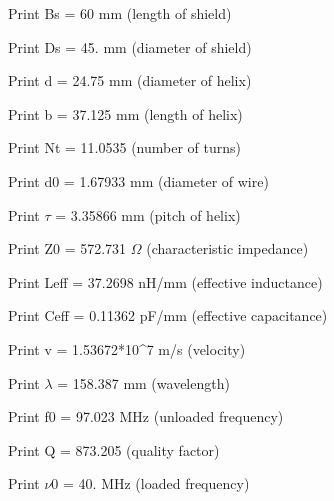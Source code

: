 \begin{mmaCell}{Print}
Bs = 60 mm (length of shield)
\end{mmaCell}

\begin{mmaCell}{Print}
Ds = 45. mm (diameter of shield)
\end{mmaCell}

\begin{mmaCell}{Print}
d = 24.75 mm (diameter of helix)
\end{mmaCell}

\begin{mmaCell}{Print}
b = 37.125 mm (length of helix)
\end{mmaCell}

\begin{mmaCell}{Print}
Nt = 11.0535 (number of turns)
\end{mmaCell}

\begin{mmaCell}{Print}
d0 = 1.67933 mm (diameter of wire)
\end{mmaCell}

\begin{mmaCell}{Print}
\(\tau\) = 3.35866 mm (pitch of helix)
\end{mmaCell}

\begin{mmaCell}{Print}
Z0 = 572.731 \(\Omega\) (characteristic impedance)
\end{mmaCell}

\begin{mmaCell}{Print}
Leff = 37.2698 nH/mm (effective inductance)
\end{mmaCell}

\begin{mmaCell}{Print}
Ceff = 0.11362 pF/mm (effective capacitance)
\end{mmaCell}

\begin{mmaCell}{Print}
v = 1.53672*10^7 m/s (velocity)
\end{mmaCell}

\begin{mmaCell}{Print}
\(\lambda\) = 158.387 mm (wavelength)
\end{mmaCell}

\begin{mmaCell}{Print}
f0 = 97.023 MHz (unloaded frequency)
\end{mmaCell}

\begin{mmaCell}{Print}
Q = 873.205 (quality factor)
\end{mmaCell}

\begin{mmaCell}{Print}
\(\nu\)0 = 40. MHz (loaded frequency)
\end{mmaCell}